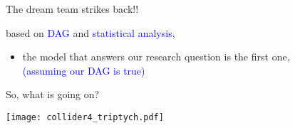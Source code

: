 %
%
\begin{lhframe}[rhgraphic={\texttt{[image: collider4\_reg1.png]}}]
	{The dream team strikes back!!}
	
	based on \textcolor{blue}{DAG} and \textcolor{blue}{statistical analysis},
	\begin{itemize}
		\item the model that answers our research question is the first one, \\
		{\small \textcolor{blue}{(assuming our DAG is true)} }
	\end{itemize}
\end{lhframe}
%
%
\begin{frame}
	{So, what is going on?}
	
	\begin{figure*}
		\texttt{[image: collider4\_triptych.pdf]}
	\end{figure*}
\end{frame}
%
%
